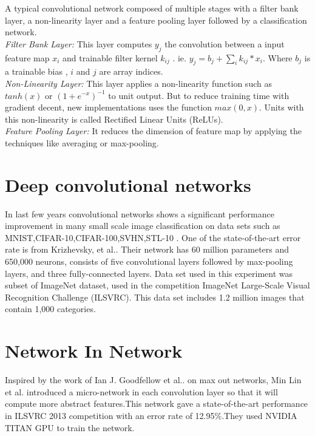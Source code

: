 \documentclass{article}
\begin{document}
\par
A typical convolutional  network composed of multiple stages with a filter bank layer, a non-linearity layer and a feature pooling layer \cite{lecun2010convolutional} followed by a classification network.\\
\emph{Filter Bank Layer:} This layer computes $y_{j}$ the convolution between a input feature map   $x_i$ and trainable filter kernel $k_{ij}$ 
. ie. $y_j=b_j+\sum_i {k_{ij}*x_i}$. Where $b_j$ is a trainable bias , $i$ and $j$ are  array indices.\\
\emph{Non-Linearity Layer:} This layer applies a non-linearity function such as $tanh(x)$ or $(1+e^{-x})^{-1}$ to unit output. But to reduce training time with gradient decent, new implementations uses the function $max(0,x)$. Units with this non-linearity is called Rectified Linear Units (ReLUs)\cite{Nair2010}.\\
\emph{Feature Pooling Layer:} It  reduces the dimension of  feature map by applying the techniques like averaging or max-pooling.

\section {Deep convolutional networks}
In last few years convolutional networks shows a significant performance improvement in many small scale image classification on data sets  such as MNIST\cite{Ciresan:2012g},CIFAR-10,CIFAR-100,SVHN\cite{lee2014deeply},STL-10 \cite{deepfwd}. One of the state-of-the-art error rate is from Krizhevsky, et al.\cite{Krizhevsky2012a}. Their network has 60 million parameters and 650,000 neurons, consists of five convolutional layers followed by max-pooling layers, and three fully-connected layers. Data set used in this experiment was subset of ImageNet dataset, used in the competition ImageNet Large-Scale Visual Recognition Challenge (ILSVRC)\cite{imagenet}. This data set includes 1.2 million images that contain 1,000 categories.






\section{Network In Network }
Inspired by the work of Ian J. Goodfellow et al..\cite{Goodfellow2013} on max out networks,  Min Lin et al. \cite{Lin2013} introduced a micro-network in each convolution layer so that it will compute more abstract features.This network gave a state-of-the-art performance in  ILSVRC 2013 competition with an error rate of 12.95\%.They used NVIDIA TITAN GPU to train the network.
\end{document}

